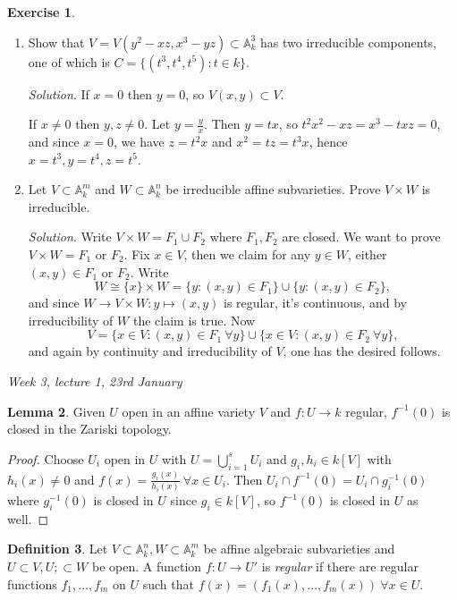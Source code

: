 \documentclass{article}
\newcommand{\A}{\mathbb{A}}
\theoremstyle{definition}
\newtheorem{defn}{Definition}[subsection]
\newtheorem{lemma}[defn]{Lemma}
\newtheorem{exe}[defn]{Exercise}
\begin{document}
\begin{exe}
\begin{enumerate}
\item Show that $V=V(y^2-xz,x^3-yz)\subset\A_k^3$ has two irreducible components, one of which is $C=\{(t^3,t^4,t^5):t\in k\}$.

\textit{Solution}. If $x=0$ then $y=0$, so $V(x,y)\subset V$.

If $x\neq 0$ then $y,z\neq 0$. Let $y=\frac{y}{x}$. Then $y=tx$, so $t^2x^2-xz=x^3-txz=0$, and since $x=0$, we have $z=t^2x$ and $x^2=tz=t^3x$, hence $x=t^3,y=t^4,z=t^5$.

\item Let $V\subset\A_k^m$ and $W\subset\A_k^n$ be irreducible affine subvarieties. Prove $V\times W$ is irreducible.

\textit{Solution}. Write $V\times W=F_1\cup F_2$ where $F_1,F_2$ are closed. We want to prove $V\times W=F_1$ or $F_2$. Fix $x\in V$, then we claim for any $y\in W$, either $(x,y)\in F_1$ or $F_2$. Write
\[
W\cong\{x\}\times W=\{y:(x,y)\in F_1\}\cup \{y:(x,y)\in F_2\},
\]
and since $W\rightarrow V\times W:y\mapsto (x,y)$ is regular, it's continuous, and by irreducibility of $W$ the claim is true. Now
\[
V=\{x\in V:(x,y)\in F_1 \ \forall y\}\cup \{x\in V:(x,y)\in F_2 \ \forall y\},
\]
and again by continuity and irreducibility of $V$, one has the desired follows.
\end{enumerate}
\end{exe}

\begin{flushright}
\textit{Week 3, lecture 1, 23rd January}
\end{flushright}

\begin{lemma}
Given $U$ open in an affine variety $V$ and $f:U\rightarrow k$ regular, $f^{-1}(0)$ is closed in the Zariski topology.
\end{lemma}
\begin{proof}
Choose $U_i$ open in $U$ with $U=\bigcup_{i=1}^s U_i$ and $g_i,h_i\in k[V]$ with $h_i(x)\neq 0$ and $f(x)=\frac{g_i(x)}{h_i(x)} \ \forall x\in U_i$. Then $U_i\cap f^{-1}(0)=U_i\cap g_i^{-1}(0)$ where $g_i^{-1}(0)$ is closed in $U$ since $g_i\in k[V]$, so $f^{-1}(0)$ is closed in $U$ as well.
\end{proof}

\begin{defn}
Let $V\subset\A_k^n,W\subset\A_k^m$ be affine algebraic subvarieties and $U\subset V,U;\subset W$ be open. A function $f:U\rightarrow U'$ is \textit{regular} if there are regular functions $f_1,\ldots,f_m$ on $U$ such that $f(x)=(f_1(x),\ldots,f_m(x)) \ \forall x\in U$.
\end{defn}
\end{document}
